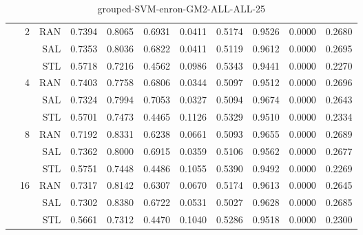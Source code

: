 \begin{center}
\begin{table}[htbp]
\begin{center}
\begin{tabular}{ | r | r | r | r | r | r | r | r | r | r | r |}
 & \multirow{3}{*}{2} & RAN & 0.7394 & 0.8065 & 0.6931 & 0.0411 & 0.5174 & 0.9526 & 0.0000 & 0.2680\\ \cline{3-11}
 &   & SAL & 0.7353 & 0.8036 & 0.6822 & 0.0411 & 0.5119 & 0.9612 & 0.0000 & 0.2695\\ \cline{3-11}
 &   & STL & 0.5718 & 0.7216 & 0.4562 & 0.0986 & 0.5343 & 0.9441 & 0.0000 & 0.2270\\ \cline{2-11}
 & \multirow{3}{*}{4} & RAN & 0.7403 & 0.7758 & 0.6806 & 0.0344 & 0.5097 & 0.9512 & 0.0000 & 0.2696\\ \cline{3-11}
 &   & SAL & 0.7324 & 0.7994 & 0.7053 & 0.0327 & 0.5094 & 0.9674 & 0.0000 & 0.2643\\ \cline{3-11}
 &   & STL & 0.5701 & 0.7473 & 0.4465 & 0.1126 & 0.5329 & 0.9510 & 0.0000 & 0.2334\\ \cline{2-11}
 & \multirow{3}{*}{8} & RAN & 0.7192 & 0.8331 & 0.6238 & 0.0661 & 0.5093 & 0.9655 & 0.0000 & 0.2689\\ \cline{3-11}
 &   & SAL & 0.7362 & 0.8000 & 0.6915 & 0.0359 & 0.5106 & 0.9562 & 0.0000 & 0.2677\\ \cline{3-11}
 &   & STL & 0.5751 & 0.7448 & 0.4486 & 0.1055 & 0.5390 & 0.9492 & 0.0000 & 0.2269\\ \cline{2-11}
 & \multirow{3}{*}{16} & RAN & 0.7317 & 0.8142 & 0.6307 & 0.0670 & 0.5174 & 0.9613 & 0.0000 & 0.2645\\ \cline{3-11}
 &   & SAL & 0.7302 & 0.8380 & 0.6722 & 0.0531 & 0.5027 & 0.9628 & 0.0000 & 0.2685\\ \cline{3-11}
 &   & STL & 0.5661 & 0.7312 & 0.4470 & 0.1040 & 0.5286 & 0.9518 & 0.0000 & 0.2300\\ \cline{2-11}
\hline
\end{tabular}
\caption{grouped-SVM-enron-GM2-ALL-ALL-25}
\end{center}
 \end{table}
\end{center}

